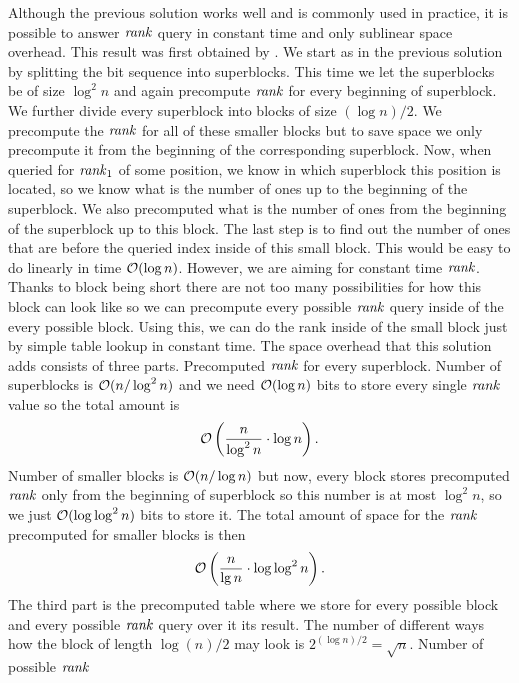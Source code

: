 Although the previous solution works well and is commonly used in practice, it is possible to
answer $\mathit{rank}$ query in constant time and only sublinear space overhead. This result was first
obtained by \cite{okanohara2007practical}. We start as in the previous solution by splitting
the bit sequence into superblocks. This time we let the superblocks be of size $\log^2 n$
and again precompute $\mathit{rank}$ for every beginning of superblock. We further divide every
superblock into blocks of size $(\log n)/2$. We precompute the $\mathit{rank}$ for all of these
smaller blocks but to save space we only precompute it from the beginning of the corresponding
superblock. Now, when queried for $\mathit{rank}_1$ of some position, we know in which superblock this
position is located, so we know what is the number of ones up to the beginning of the superblock.
We also precomputed what is the number of ones from the beginning of the superblock up to this
block. The last step is to find out the number of ones that are before the queried index inside of
this small block. This would be easy to do linearly in time $\mathcal{O}(\log n)$. However, we are aiming for
constant time $\mathit{rank}$. Thanks to block being short there are not too many possibilities for how
this block can look like so we can precompute every possible $\mathit{rank}$ query inside of the every possible
block. Using this, we can do the rank inside of the small block just by simple table lookup in constant
time. The space overhead that this solution adds consists of three parts. Precomputed $\mathit{rank}$ for every
superblock. Number of superblocks is $\mathcal{O}(n/\log^2 n)$ and we need $\mathcal{O}(\log n)$ bits to store every
single $\mathit{rank}$ value so the total amount is
\begin{equation}
    \mathcal{O}\left(\frac{n}{\log^2 n}\cdot \log n\right).
    \label{eq:rank_space_1}
\end{equation}
Number of smaller blocks is $\mathcal{O}(n/\log n)$ but now, every block stores precomputed $\mathit{rank}$ only from the
beginning of superblock so this number is at most $\log^2 n$, so we just $\mathcal{O}(\log\log^2 n)$ bits
to store it. The total amount of space for the $\mathit{rank}$ precomputed for smaller blocks is then
\begin{equation}
    \mathcal{O}\left(\frac{n}{\lg n}\cdot \log\log^2 n\right).
    \label{eq:rank_space_2}
\end{equation}
The third part is the precomputed table where we store for every possible block and every
possible $\mathit{rank}$ query over it its result. The number of different ways how the block of length
$\log(n)/2$ may look is $2^{(\log n)/2} = \sqrt{n}$. Number of possible $\mathit{rank}$
